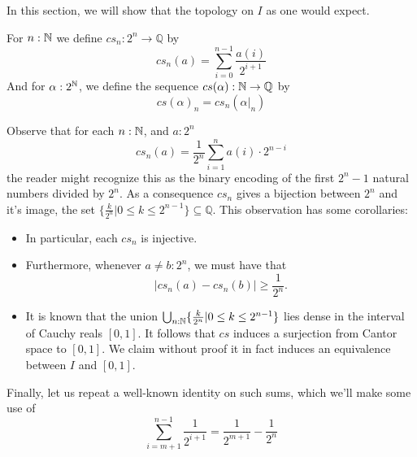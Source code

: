 In this section, we will show that the topology on $I$ as one would expect. 

\begin{definition}
  For $n:\mathbb{N}$ we define 
  $cs_n:2^n \to \mathbb Q$ by 
  \begin{equation}
    cs_n(a) = \sum\limits_{i=0}^{n-1} \frac{a(i)} {2^{i+1}}
  \end{equation}
  And for $\alpha:2^{\mathbb{N}}$, we define the sequence $cs(\alpha) : \mathbb{N} \to \mathbb Q$ by 
  \begin{equation}
    cs(\alpha)_n = cs_n(\alpha|_n)
  \end{equation}
\end{definition}
\begin{remark}\label{rmkPropertiesCSn}
  Observe that for each $n:\mathbb{N}$, and $a:2^n$
  \begin{equation}
    cs_n(a) = \frac{1}{2^n} \sum_{i=1}^{n} a(i) \cdot 2^{n-i}
  \end{equation}
  the reader might recognize this as the binary encoding of the first $2^n-1$ natural numbers divided by $2^n$. 
  As a consequence $cs_n$ gives a bijection between $2^n$ and it's image, the set 
  $\{\frac{k}{2^n}|0\leq k \leq 2^{n-1}\}\subseteq \mathbb Q$.
  This observation has some corollaries: 
  \begin{itemize}
    \item In particular, each $cs_n$ is injective. 
    \item Furthermore, whenever $a\neq b:2^n$, we must have that 
      \begin{equation} 
        |cs_n(a)-cs_n(b)|\geq \frac{1}{2^n}.
      \end{equation}
    \item It is known that the union $\bigcup_{n:\mathbb{N}} \{\frac{k}{2^n}|0\leq k \leq 2^{n-1}\}$ 
      lies dense in the interval of Cauchy reals $[0,1]$. 
      It follows that $cs$ induces a surjection from Cantor space to $[0,1]$. %
      We claim without proof it in fact induces an equivalence between $I$ and $[0,1]$.
  \end{itemize}
  Finally, let us repeat a well-known identity on such sums, which we'll make some use of 
  \begin{equation}
   \sum\limits_{i = m+1}^{n-1} \frac{1}{2^{i+1}} = \frac{1}{2^{m+1}} - \frac{1}{2^n}
  \end{equation}
\end{remark}
